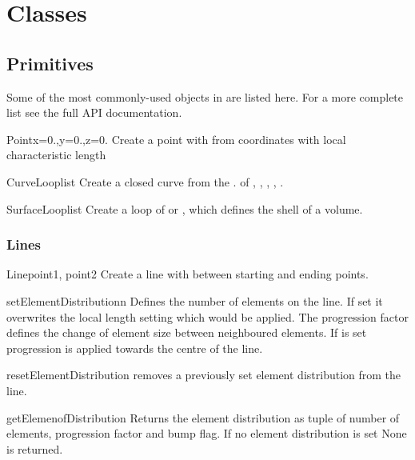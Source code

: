 \section{\pycad Classes}

\subsection{Primitives}

Some of the most commonly-used objects in \pycad are listed here. For a more complete
list see the full API documentation.


\begin{classdesc}{Point}{x=0.,y=0.,z=0.}
Create a point with from coordinates with local characteristic length 
\end{classdesc}

\begin{classdesc}{CurveLoop}{list}
Create a closed curve from the . of
, , , ,
.
\end{classdesc}

\begin{classdesc}{SurfaceLoop}{list}
Create a loop of  or , which defines the shell of a volume.
\end{classdesc}

\subsubsection{Lines}
\begin{classdesc}{Line}{point1, point2}
Create a line with between starting and ending points.
\end{classdesc}
\begin{methoddesc}[Line]{setElementDistribution}{n}
Defines the number of elements on the line. If set it overwrites the local length setting which would be applied. The progression factor  defines the change of element size between neighboured elements. If  is set
progression is applied towards the centre of the line.
\end{methoddesc}
\begin{methoddesc}[Line]{resetElementDistribution}{}
removes a previously set element distribution from the line.
\end{methoddesc}
\begin{methoddesc}[Line]{getElemenofDistribution}{}
Returns the element distribution as tuple of
number of elements, progression factor and bump flag. If
no element distribution is set None is returned.
\end{methoddesc}

